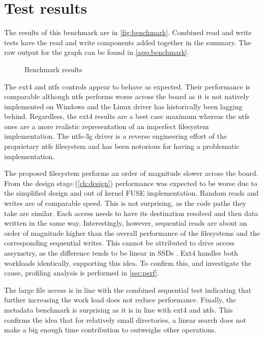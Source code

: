    \section{Test results}

        The results of this benchmark are in \autoref{fig:benchmark}.
        Combined read and write tests have the read and write components added
        together in the summary. The raw output for the graph can be found in
        \autoref{app:benchmark}.

        \begin{figure}[h]
            
            \vspace{-20pt}
            \caption{Benchmark results}
            \label{fig:benchmark}
        \end{figure}

        The ext4 and ntfs controls appear to behave as expected. Their
        performance is comparable although ntfs performs worse across the board
        as it is not natively implemented on Windows and the Linux driver has
        historically been lagging behind. Regardless, the ext4 results are a
        best case maximum whereas the ntfs ones are a more realistic
        representation of an imperfect filesystem implementation. The ntfs-3g
        driver is a reverse engineering effort of the proprietary ntfs
        filesystem and has been notorious for having a problematic
        implementation.

        The proposed filesystem performs an order of magnitude slower across
        the board. From the design stage (\autoref{ch:design}) performance was
        expected to be worse due to the simplified design and out of kernel
        FUSE implementation. Random reads and writes are of comparable speed.
        This is not surprising, as the code paths they take are similar. Each
        access needs to have its destination resolved and then data written in
        the same way. Interestingly, however, sequential reads are about an
        order of magnitude higher than the overall performance of the
        filesystems and the corresponding sequential writes. This cannot be
        attributed to drive access assymetry, as the difference tends to be
        linear in SSDs \cite{servethehome_review}. Ext4 handles both workloads
        identically, supporting this idea. To confirm this, and investigate the
        cause, profiling analysis is performed in \autoref{sec:perf}.

        The large file access is in line with the combined sequential test
        indicating that further increasing the work load does not reduce
        performance. Finally, the metadata benchmark is surprising as it is in
        line with ext4 and ntfs. This confirms the idea that for relatively
        small directories, a linear search does not make a big enough time
        contribution to outweighs other operations.

